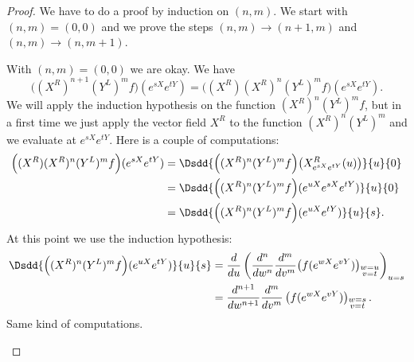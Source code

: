 \begin{proof}
    We have to do a proof by induction on \( (n,m)\). We start with \( (n,m)=(0,0)\) and we prove the steps \( (n,m)\to (n+1,m)\) and \( (n,m)\to (n,m+1)\).

    \begin{subproof}
        \spitem[\( (0,0)\)]
            With \( (n,m)=(0,0)\) we are okay.
        \spitem[\( (n+1,m)\)]
            We have
            \begin{equation}
                \Big( (X^R)^{n+1}(Y^L)^mf \Big)( e^{sX} e^{tY})=\big( (X^R)(X^R)^n(Y^L)^mf \big)( e^{sX} e^{tY}).
            \end{equation}
            We will apply the induction hypothesis on the function \( (X^R)^n(Y^L)^mf\), but in a first time we just apply the vector field \( X^R\) to the function \( (X^R)^n(Y^L)^m\) and we evaluate at \(  e^{sX} e^{tY}\). Here is a couple of computations:
            \begin{subequations}
                \begin{align}
                    \Big( (X^R)(X^R)^n(Y^L)^mf \Big)( e^{sX} e^{tY})&=\Dsdd{  \Big( (X^R)^n(Y^L)^mf \Big)\big( X^R_{ e^{sX} e^{tY}}(u) \big)  }{u}{0}\\
                    &=\Dsdd{  \Big( (X^R)^n(Y^L)^mf \Big)(  e^{uX} e^{sX} e^{tY} )  }{u}{0}\\
                    &=\Dsdd{  \Big( (X^R)^n(Y^L)^mf \Big)( e^{uX} e^{tY})  }{u}{s}.
                \end{align}
            \end{subequations}
            At this point we use the induction hypothesis:
            \begin{subequations}
                \begin{align}
                    \Dsdd{  \Big( (X^R)^n(Y^L)^mf \Big)( e^{uX} e^{tY})  }{u}{s}&=\frac{ d }{ du }\left( \frac{ d^n }{ dw^n }\frac{ d^m }{ dv^m }\big( f( e^{wX} e^{vY}) \big)_{\substack{w=u\\v=t}}  \right)_{u=s}\\
                    &=\frac{ d^{n+1} }{ dw^{n+1} }\frac{ d^m }{ dv^m }\left( f( e^{wX} e^{vY}) \right)_{\substack{w=s\\v=t}}.
                \end{align}
            \end{subequations}
        \spitem[\( (n,m+1)\)]
            Same kind of computations.
    \end{subproof}
\end{proof}



